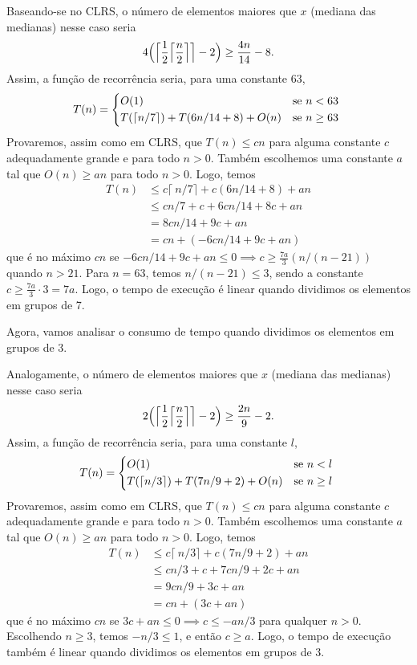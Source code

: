 \documentclass{article}
\begin{document}
Baseando-se no CLRS, o número de elementos maiores que $x$ (mediana das medianas) nesse caso seria
$$4\Bigl(\Big\lceil\frac{1}{2}\Big\lceil\frac{n}{2}\Big\rceil\Big\rceil-2\Bigr) \geq \frac{4n}{14} - 8 .$$
Assim, a função de recorrência seria, para uma constante $63$,
\begin{align*}
T(n) =
  \begin{cases*}
    O(1) &\text{se} $n < 63$ \\
    T(\lceil n/7 \rceil) + T(6n/14+8) + O(n) &\text{se} $n \geq 63$
  \end{cases*}
\end{align*}
Provaremos, assim como em CLRS, que $T(n) \leq cn$ para alguma constante $c$ adequadamente grande e para todo $n>0$.
Também escolhemos uma constante $a$ tal que $O(n) \geq an$ para todo $n>0$.
Logo, temos
\begin{align*}
  T(n) &\leq c \lceil\ n/7 \rceil + c(6n/14 + 8) + an \\
  &\leq cn/7 + c + 6cn/14 + 8c + an \\
  &= 8cn/14 + 9c + an \\
  &= cn + (-6cn/14 + 9c + an)
\end{align*}
que é no máximo $cn$ se $-6cn/14 + 9c + an \leq 0 \implies c \geq \frac{7a}{3}(n/(n-21))$ quando $n > 21$.
Para $n=63$, temos $n/(n-21) \leq 3$, sendo a constante $c \geq \frac{7a}{3} \cdot 3 = 7a$.
Logo, o tempo de execução é linear quando dividimos os elementos em grupos de 7.

\bigskip

Agora, vamos analisar o consumo de tempo quando dividimos os elementos em grupos de 3.

Analogamente, o número de elementos maiores que $x$ (mediana das medianas) nesse caso seria
$$2\Bigl(\Big\lceil\frac{1}{2}\Big\lceil\frac{n}{2}\Big\rceil\Big\rceil-2\Bigr) \geq \frac{2n}{9} - 2 .$$
Assim, a função de recorrência seria, para uma constante $l$,
\begin{align*}
T(n) =
  \begin{cases*}
    O(1) &\text{se} $n < l$ \\
    T(\lceil n/3 \rceil) + T(7n/9 + 2) + O(n) &\text{se} $n \geq l$
  \end{cases*}
\end{align*}
Provaremos, assim como em CLRS, que $T(n) \leq cn$ para alguma constante $c$ adequadamente grande e para todo $n>0$.
Também escolhemos uma constante $a$ tal que $O(n) \geq an$ para todo $n>0$.
Logo, temos
\begin{align*}
  T(n) &\leq c \lceil\ n/3 \rceil + c(7n/9 + 2) + an \\
  &\leq cn/3 + c + 7cn/9 + 2c + an \\
  &= 9cn/9 + 3c + an \\
  &= cn + (3c + an)
\end{align*}
que é no máximo $cn$ se $3c + an \leq 0 \implies c \leq -an/3$ para qualquer $n > 0$.
Escolhendo $n \geq 3$, temos $-n/3 \leq 1$, e então $c \geq a$.
Logo, o tempo de execução também é linear quando dividimos os elementos em grupos de 3.
\end{document}
